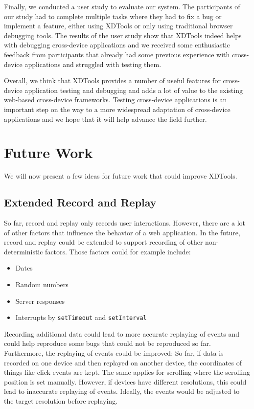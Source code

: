 Finally, we conducted a user study to evaluate our system. The participants of our study had to complete multiple tasks where they had to fix a bug or implement a feature, either using XDTools or only using traditional browser debugging tools. The results of the user study show that XDTools indeed helps with debugging cross-device applications and we received some enthusiastic feedback from participants that already had some previous experience with cross-device applications and struggled with testing them. 

Overall, we think that XDTools provides a number of useful features for cross-device application testing and debugging and adds a lot of value to the existing web-based cross-device frameworks. Testing cross-device applications is an important step on the way to a more widespread adaptation of cross-device applications and we hope that it will help advance the field further.

\section{Future Work}

We will now present a few ideas for future work that could improve XDTools.

\subsection{Extended Record and Replay}

So far, record and replay only records user interactions. However, there are a lot of other factors that influence the behavior of a web application. In the future, record and replay could be extended to support recording of other non-deterministic factors. Those factors could for example include:
\begin{itemize}
	\item Dates
	\item Random numbers
	\item Server responses
	\item Interrupts by \lstinline|setTimeout| and \lstinline|setInterval|
\end{itemize}
Recording additional data could lead to more accurate replaying of events and could help reproduce some bugs that could not be reproduced so far. Furthermore, the replaying of events could be improved: So far, if data is recorded on one device and then replayed on another device, the coordinates of things like click events are kept. The same applies for scrolling where the scrolling position is set manually. However, if devices have different resolutions, this could lead to inaccurate replaying of events. Ideally, the events would be adjusted to the target resolution before replaying.

